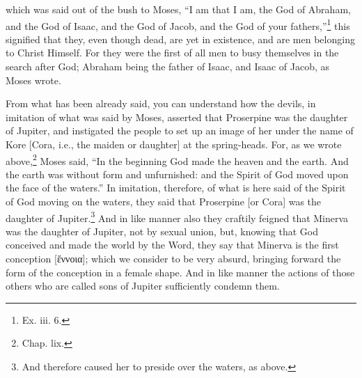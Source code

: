 which was said out of the bush to Moses, “I am that I am, the God of Abraham, and the God of Isaac, and the God of Jacob, and the God of your fathers,”\footnote{Ex. iii. 6.} this signified that they, even though dead, are yet in existence, and are men belonging to Christ Himself. For they were the first of all men to busy themselves in the search after God; Abraham being the father of Isaac, and Isaac of Jacob, as Moses wrote.


From what has been already said, you can  understand how the devils, in imitation of what was said by Moses, asserted that Proserpine was the daughter of Jupiter, and instigated the people to set up an image of her under the name of Kore [Cora, i.e., the maiden or daughter] at the spring-heads. For, as we wrote above,\footnote{Chap. lix.} Moses said, “In the beginning God made the heaven and the earth. And the earth was without form and unfurnished: and the Spirit of God moved upon the face of the waters.” In imitation, therefore, of what is here said of the Spirit of God moving on the waters, they said that Proserpine [or Cora] was the daughter of Jupiter.\footnote{And therefore caused her to preside over the waters, as above.} And in like manner also they craftily feigned that Minerva was the daughter of Jupiter, not by sexual union, but, knowing that God conceived and made the world by the Word, they say that Minerva is the first conception [\textgreek{ἔννοια}]; which we consider to be very absurd, bringing forward the form of the conception in a female shape. And in like manner the actions of those others who are called sons of Jupiter sufficiently condemn them.


